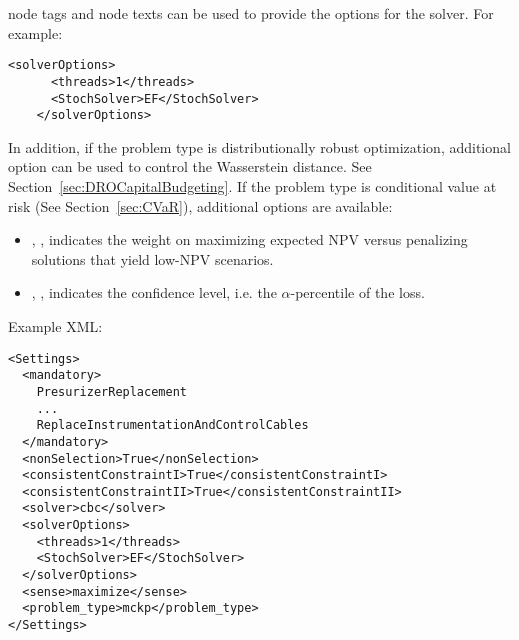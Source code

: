 \begin{itemize}
  node tags and node texts can be used to provide the options for the solver. For example:
  \begin{lstlisting}[style=XML]
    <solverOptions>
      <threads>1</threads>
      <StochSolver>EF</StochSolver>
    </solverOptions>
  \end{lstlisting}
  In addition, if the problem type is distributionally robust optimization, additional option
   can be used to control the Wasserstein distance. See Section~\ref{sec:DROCapitalBudgeting}.
  If the problem type is conditional value at risk (See Section~\ref{sec:CVaR}), additional options are available:
  \begin{itemize}
    \item {}, , indicates the weight on
    maximizing expected NPV versus penalizing solutions that yield low-NPV scenarios.
    \item {}, ,  indicates
    the confidence level, i.e. the $\alpha$-percentile of the loss.
  \end{itemize}
\end{itemize}

Example XML:
\begin{lstlisting}[style=XML]
<Settings>
  <mandatory>
    PresurizerReplacement
    ...
    ReplaceInstrumentationAndControlCables
  </mandatory>
  <nonSelection>True</nonSelection>
  <consistentConstraintI>True</consistentConstraintI>
  <consistentConstraintII>True</consistentConstraintII>
  <solver>cbc</solver>
  <solverOptions>
    <threads>1</threads>
    <StochSolver>EF</StochSolver>
  </solverOptions>
  <sense>maximize</sense>
  <problem_type>mckp</problem_type>
</Settings>
\end{lstlisting}
